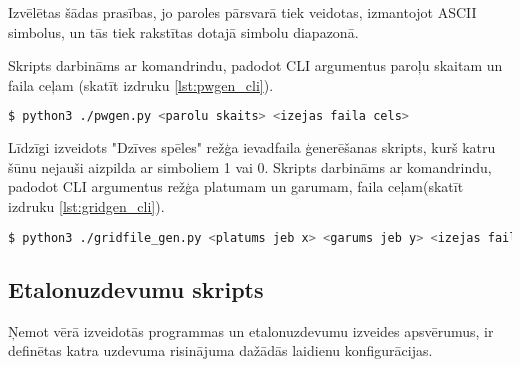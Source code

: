 Izvēlētas šādas prasības, jo paroles pārsvarā tiek veidotas, izmantojot ASCII
simbolus, un tās  tiek rakstītas dotajā simbolu diapazonā.
\cite{pw_user_practice}

Skripts darbināms ar komandrindu, padodot CLI argumentus paroļu skaitam
un faila ceļam (skatīt izdruku \ref{lst:pwgen_cli}).
\begin{lstlisting}[caption={Paroļu faila ģenerēšanas skripta darbināšana},
    captionpos=b,
    label=lst:pwgen_cli, language=bash]
$ python3 ./pwgen.py <parolu skaits> <izejas faila cels>
\end{lstlisting}

Līdzīgi izveidots "Dzīves spēles" režģa ievadfaila ģenerēšanas skripts, kurš
katru šūnu nejauši aizpilda ar simboliem 1 vai 0. Skripts darbināms ar 
komandrindu, padodot CLI argumentus režģa platumam un garumam, faila
ceļam(skatīt izdruku \ref{lst:gridgen_cli}).

\begin{lstlisting}[caption={Režģa faila ģenerēšanas skripta darbināšana},
    captionpos=b,
    label=lst:gridgen_cli, language=bash]
$ python3 ./gridfile_gen.py <platums jeb x> <garums jeb y> <izejas faila cels>
\end{lstlisting}

\subsection{Etalonuzdevumu skripts}
Ņemot vērā izveidotās programmas un etalonuzdevumu izveides apsvērumus, ir
definētas katra uzdevuma risinājuma dažādās laidienu konfigurācijas.

